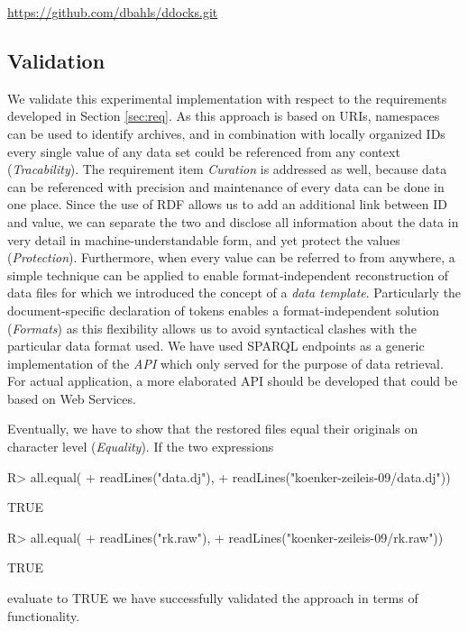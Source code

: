 \documentclass{acm_proc_article-sp}
\begin{document}
%
%
\url{https://github.com/dbahls/ddocks.git}




\subsection{Validation}


We validate this experimental implementation with respect to the requirements developed in Section \ref{sec:req}.
As this approach is based on URIs, namespaces can be used to identify archives, and in combination with locally organized IDs every single value of any data set could be referenced from any context (\textit{Tracability}).
The requirement item \textit{Curation} is addressed as well, because data can be referenced with precision and maintenance of every data can be done in one place. 
Since the use of RDF allows us to add an additional link between ID and value, we can separate the two and disclose all information about the data in very detail in machine-understandable form, and yet protect the values (\textit{Protection}).
Furthermore, when every value can be referred to from anywhere, a simple technique can be applied to enable format-independent reconstruction of data files for which we introduced the concept of a \textit{data template}.
Particularly the document-specific declaration of tokens enables a format-independent solution (\textit{Formats}) as this flexibility allows us to avoid syntactical clashes with the particular data format used.
We have used SPARQL endpoints as a generic implementation of the \textit{API} which only served for the purpose of data retrieval.
For actual application, a more elaborated API should be developed that could be based on Web Services.



Eventually, we have to show that the restored files equal their originals on character level (\textit{Equality}).
If the two expressions
\begin{Schunk}
\begin{Sinput}
R> all.equal(
+    readLines("data.dj"), 
+    readLines("koenker-zeileis-09/data.dj")) 
\end{Sinput}
\begin{Soutput}
[1] TRUE
\end{Soutput}
\begin{Sinput}
R> all.equal(
+    readLines("rk.raw"), 
+    readLines("koenker-zeileis-09/rk.raw")) 
\end{Sinput}
\begin{Soutput}
[1] TRUE
\end{Soutput}
\end{Schunk}
evaluate to TRUE we have successfully validated the approach in terms of functionality.
\end{document}
